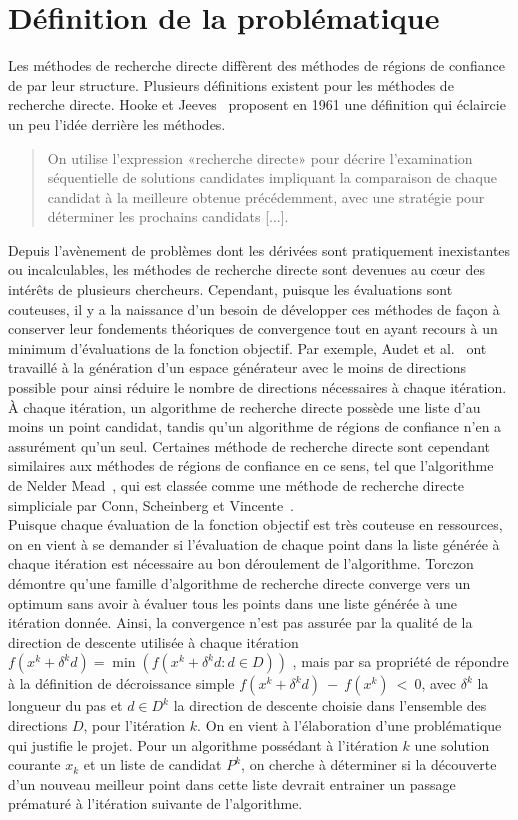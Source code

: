 \section{Définition de la problématique}\label{sec:dpr}
Les méthodes de recherche directe diffèrent des méthodes de régions de confiance de par leur structure. Plusieurs définitions existent pour les méthodes de recherche directe. Hooke et Jeeves~\cite{HoJe61a} proposent en 1961 une définition qui éclaircie un peu l'idée derrière les méthodes.
\begin{quote}
	On utilise l'expression «recherche directe» pour décrire l'examination séquentielle de solutions candidates impliquant la comparaison de chaque candidat à la meilleure obtenue précédemment, avec une stratégie pour déterminer les prochains candidats [...].
\end{quote}
Depuis l'avènement de problèmes dont les dérivées sont pratiquement inexistantes ou incalculables, les méthodes de recherche directe sont devenues au cœur des intérêts de plusieurs chercheurs. Cependant, puisque les évaluations sont couteuses, il y a la naissance d'un besoin de développer ces méthodes de façon à conserver leur fondements théoriques de convergence tout en ayant recours à un minimum d'évaluations de la fonction objectif. Par exemple, Audet et al.~\cite{AuIaLeDTr2014} ont travaillé à la génération d'un espace générateur avec le moins de directions possible pour ainsi réduire le nombre de directions nécessaires à chaque itération.
À chaque itération, un algorithme de recherche directe possède une liste d'au moins un point candidat, tandis qu'un algorithme de régions de confiance n'en a assurément qu'un seul. Certaines méthode de recherche directe sont cependant similaires aux méthodes de régions de confiance en ce sens, tel que l'algorithme de Nelder Mead~\cite{NeMe65a}, qui est classée comme une méthode de recherche directe simpliciale par Conn, Scheinberg et Vincente~\cite{CoScVibook}.\\
Puisque chaque évaluation de la fonction objectif est très couteuse en ressources, on en vient à se demander si l'évaluation de chaque point dans la liste générée à chaque itération est nécessaire au bon déroulement de l'algorithme. Torczon~\cite{Torc97a} démontre qu'une famille d'algorithme de recherche directe converge vers un optimum sans avoir à évaluer tous les points dans une liste générée à une itération donnée. Ainsi, la convergence n'est pas assurée par la qualité de la direction de descente utilisée à chaque itération $f(x^k+\delta^k d) = \min(f(x^k+\delta^k d:d\in D)) $ , mais par sa propriété de répondre à la définition de décroissance simple $f(x^k+\delta^k d)~-~f(x^k)~<~0$, avec $\delta^k$ la longueur du pas et $d \in D^k $ la direction de descente choisie dans l'ensemble des directions $D$, pour l'itération $k$. On en vient à l'élaboration d'une problématique qui justifie le projet. Pour un algorithme possédant à l'itération $k$ une solution courante $x_k$ et un liste de candidat $P^k$, on cherche à déterminer si la découverte d'un nouveau meilleur point dans cette liste devrait entrainer un passage prématuré à l'itération suivante de l'algorithme.\\
